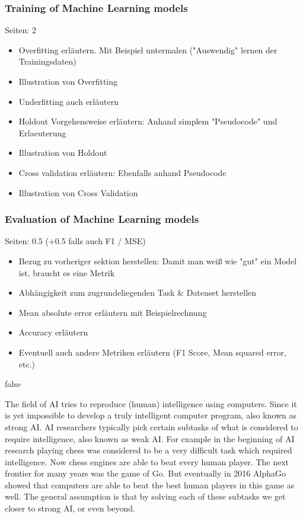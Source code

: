 \documentclass[draft,final,oneside]{vutinfth} %
\begin{document}
\subsubsection{Training of Machine Learning models}
Seiten: 2
\begin{itemize}

\item Overfitting erläutern. Mit Beispiel untermalen ("Auswendig" lernen der Trainingsdaten)
\item Illustration von Overfitting
\item Underfitting auch erläutern
\item Holdout Vorgehensweise erläutern: Anhand simplem "Pseudocode" und Erlaeuterung
\item Illustration von Holdout
\item Cross validation erläutern: Ebenfalls anhand Pseudocode
\item Illustration von Cross Validation

\end{itemize}

\subsubsection{Evaluation of Machine Learning models}
Seiten: 0.5 (+0.5 falls auch F1 / MSE)
\begin{itemize}

\item Bezug zu vorheriger sektion herstellen: Damit man weiß wie "gut" ein Model ist, braucht es eine Metrik
\item Abhängigkeit zum zugrundeliegenden Task \& Datenset herstellen
\item Mean absolute error erläutern mit Beispielrechnung
\item Accuracy erläutern
\item Eventuell auch andere Metriken erläutern (F1 Score, Mean squared error, etc.)

\end{itemize}


\if false

The field of AI tries to reproduce (human) intelligence using computers. Since it is yet impossible to develop a truly intelligent computer program, also known as strong AI. AI researchers typically pick certain subtasks of what is considered to require intelligence, also known as weak AI. For example in the beginning of AI research playing chess was considered to be a very difficult task which required intelligence. Now chess engines are able to beat every human player. The next frontier for many years was the game of Go. But eventually in 2016 AlphaGo showed that computers are able to beat the best human players in this game as well. The general assumption is that by solving each of these subtasks we get closer to strong AI, or even beyond.
\end{document}
